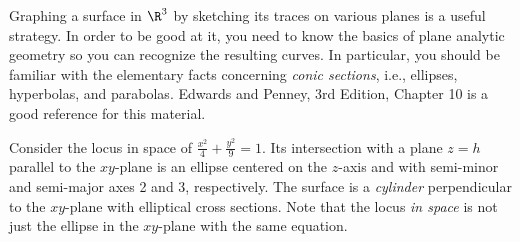 Graphing a surface in $\R^3$ by sketching its traces on various
planes is a useful strategy.  In order to be good at it, you need
to know the basics of plane analytic geometry so you can recognize
the resulting curves.  In particular, you should be familiar with
the elementary facts concerning \emph{conic sections}, i.e.,
ellipses, hyperbolas, and parabolas.   Edwards and Penney, 3rd Edition,
Chapter 10 is a good reference for this material.

\begin{example}
	Consider the locus in space of $\displaystyle{\frac{x^2}4 +
	\frac{y^2} 9} = 1$.   Its intersection with a plane $z = h$
	parallel to the $xy$-plane is an ellipse centered on the $z$-axis
	and with semi-minor and semi-major axes  2 and 3, respectively.   The surface
	is a \emph{cylinder} perpendicular to the $xy$-plane with
	elliptical cross sections.
	Note that the locus \emph{in space} is not just the ellipse
	in the $xy$-plane with the same equation.
	
	\begin{center}
	\end{center}
\end{example}

